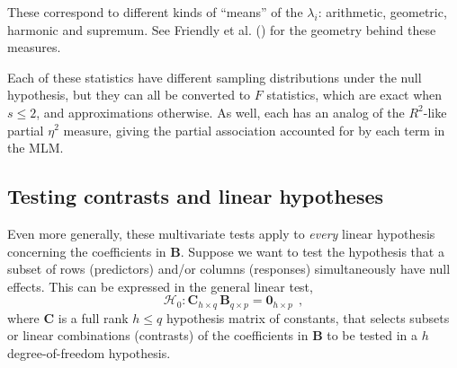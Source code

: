 \documentclass[
  letterpaper,
  10pt,
  krantz2]{krantz}
\begin{document}
\begin{table}

\caption{\label{tbl-mstats}Test statistics for multivariate tests
combine the size of dimensions of \(\mathbf{H}\mathbf{E}^{-1}\) into a
single measure.}


\end{table}%

These correspond to different kinds of ``means'' of the \(\lambda_i\):
arithmetic, geometric, harmonic and supremum. See Friendly et al.
() for the geometry
behind these measures.

Each of these statistics have different sampling distributions under the
null hypothesis, but they can all be converted to \(F\) statistics,
which are exact when \(s \le 2\), and approximations otherwise. As well,
each has an analog of the \(R^2\)-like partial \(\eta^2\) measure,
giving the partial association accounted for by each term in the MLM.

\subsection{Testing contrasts and linear
hypotheses}\label{testing-contrasts-and-linear-hypotheses}

Even more generally, these multivariate tests apply to \emph{every}
linear hypothesis concerning the coefficients in \(\mathbf{B}\). Suppose
we want to test the hypothesis that a subset of rows (predictors) and/or
columns (responses) simultaneously have null effects. This can be
expressed in the general linear test, \[
\mathcal{H}_0 : \mathbf{C}_{h \times q} \, \mathbf{B}_{q \times p} = \mathbf{0}_{h \times p} \:\: ,
\] where \(\mathbf{C}\) is a full rank \(h \le q\) hypothesis matrix of
constants, that selects subsets or linear combinations (contrasts) of
the coefficients in \(\mathbf{B}\) to be tested in a \(h\)
degree-of-freedom hypothesis.
\end{document}
